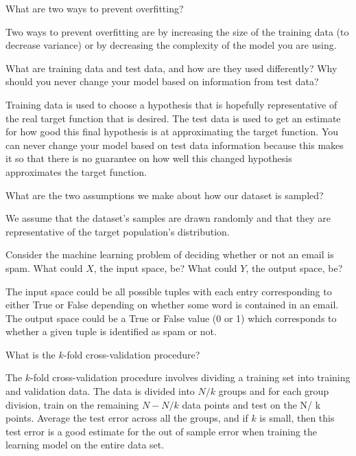 \begin{problem}[2]
  What are two ways to prevent overfitting?
\end{problem}
\begin{solution}
  Two ways to prevent overfitting are by increasing the size of
  the training data (to decrease variance) or by decreasing the
  complexity of the model you are using.
\end{solution}

\begin{problem}[2]
  What are training data and test data, and how are they used differently? Why should you never change your model based on information from test data?
\end{problem}
\begin{solution}
  Training data is used to choose a hypothesis that is hopefully
  representative of the real target function that is desired. The
  test data is used to get an estimate for how good this final
  hypothesis is at approximating the target function. You can
  never change your model based on test data information because
  this makes it so that there is no guarantee on how well this
  changed hypothesis approximates the target function.
\end{solution}

\begin{problem}[2]
  What are the two assumptions we make about how our dataset is sampled?
\end{problem}
\begin{solution}
  We assume that the dataset's samples are drawn randomly and
  that they are representative of the target population's 
  distribution.
\end{solution}

\begin{problem}[2]
  Consider the machine learning problem of deciding whether or not an email is spam. What could $X$, the input space, be? What could $Y$, the output space, be?
\end{problem}
\begin{solution}
  The input space could be all possible tuples with each entry
  corresponding to either True or False depending on whether some
  word is contained in an email. The output space could be a
  True or False value (0 or 1) which corresponds to whether a
  given tuple is identified as spam or not.
\end{solution}

\begin{problem}[2]
  What is the $k$-fold cross-validation procedure?
\end{problem}
\begin{solution}
  The $k$-fold cross-validation procedure involves dividing a
  training set into training and validation data. The data is
  divided into $N/ k$ groups and for each group division, train on
  the remaining $N - N/ k$ data points and test on the N/ k
  points. Average the test error across all the groups, and if
  $k$ is small, then this test error is a good estimate for the
  out of sample error when training the learning model on the
  entire data set. 
\end{solution}



